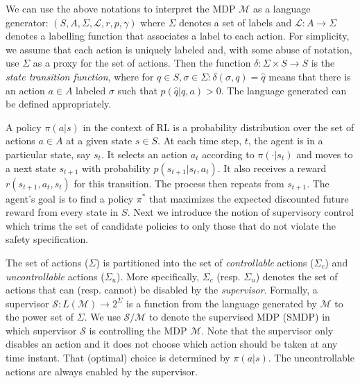 \documentclass[letterpaper, 10 pt, conference]{ieeeconf}
\begin{document}
We can use the above notations to interpret the MDP $\mathcal{M}$ as a language generator: $(S, A, \Sigma, \mathcal{L}, r, p, \gamma)$ where $\Sigma$ denotes a set of labels and $\mathcal{L}: A \rightarrow \Sigma$ denotes a labelling function that associates a label to each action. For simplicity, we assume that each action is uniquely labeled and, with some abuse of notation, use $\Sigma$ as a proxy for the set of actions. Then the function $\delta: \Sigma \times S \rightarrow S$ is the \textit{state transition function}, where for $q \in S, \sigma \in \Sigma: \delta(\sigma, q) = \widehat{q}$ means that there is an action $a \in A$ labeled $\sigma$ such that $p(\widehat{q}|q, a) > 0$. The language generated can be defined appropriately. %


A policy $\pi(a|s)$ in the context of RL is a probability distribution over the set of actions $a \in A$ at a given state $s \in S$. At each time step, $t$, the agent is in a particular state, say $s_t$. It selects an action $a_t$ according to $\pi(\cdot|s_t)$ and moves to a next state $s_{t+1}$ with probability $p(s_{t+1}|s_t, a_t)$. It also receives a reward $r(s_{t+1}, a_t, s_t)$ for this transition. The process then repeats from $s_{t+1}$. The agent's goal is to find a policy $\pi^{*}$ that maximizes the expected discounted future reward from every state in $S$. Next we introduce the notion of supervisory control which trims the set of candidate policies to only those that do not violate the safety specification. 

The set of actions ($\Sigma$) is partitioned into the set of \textit{controllable} actions ($\Sigma_c$) and \textit{uncontrollable} actions ($\Sigma_u$). More specifically, $\Sigma_c$ (resp. $\Sigma_u$) denotes the set of actions that can (resp. cannot) be disabled by the \textit{supervisor}. Formally, a supervisor $\mathcal{S}: L(\mathcal{M}) \rightarrow 2^{\Sigma}$ is a function from the language generated by $\mathcal{M}$ to the power set of $\Sigma$. We use $\mathcal{S}/\mathcal{M}$ to denote the supervised MDP (SMDP) in which supervisor $\mathcal{S}$ is controlling the MDP $\mathcal{M}$. Note that the supervisor only disables an action and it does not choose which action should be taken at any time instant. That (optimal) choice is determined by $\pi(a|s)$. The uncontrollable actions are always enabled by the supervisor.
\end{document}
